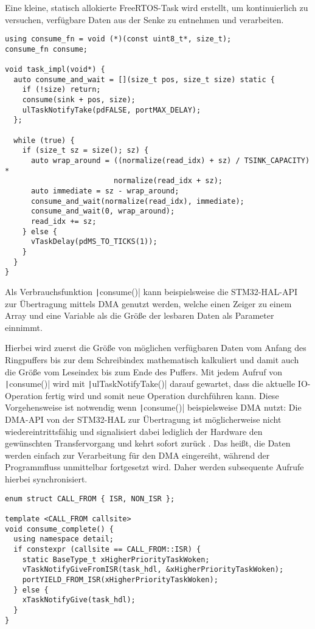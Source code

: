 Eine kleine, statisch allokierte FreeRTOS-Task wird erstellt, um kontinuierlich
zu versuchen, verfügbare Daten aus der Senke zu entnehmen und verarbeiten.

\begin{code}
\begin{verbatim}
using consume_fn = void (*)(const uint8_t*, size_t);
consume_fn consume;

void task_impl(void*) {
  auto consume_and_wait = [](size_t pos, size_t size) static {
    if (!size) return;
    consume(sink + pos, size);
    ulTaskNotifyTake(pdFALSE, portMAX_DELAY);
  };

  while (true) {
    if (size_t sz = size(); sz) {
      auto wrap_around = ((normalize(read_idx) + sz) / TSINK_CAPACITY) *
                         normalize(read_idx + sz);
      auto immediate = sz - wrap_around;
      consume_and_wait(normalize(read_idx), immediate);
      consume_and_wait(0, wrap_around);
      read_idx += sz;
    } else {
      vTaskDelay(pdMS_TO_TICKS(1));
    }
  }
}
\end{verbatim}
\end{code}

Als Verbrauchsfunktion \texttt|consume()| kann beispielsweise die
STM32-HAL-API zur Übertragung mittels DMA genutzt werden, welche einen Zeiger
zu einem Array und eine Variable als die Größe der lesbaren Daten als Parameter
einnimmt.

Hierbei wird zuerst die Größe von möglichen verfügbaren Daten vom Anfang des
Ringpuffers bis zur dem Schreibindex mathematisch kalkuliert und damit auch die
Größe vom Leseindex bis zum Ende des Puffers. Mit jedem Aufruf von
\texttt|consume()| wird mit \texttt|ulTaskNotifyTake()| darauf
gewartet, dass die aktuelle IO-Operation fertig wird und somit neue Operation
durchführen kann. Diese Vorgehensweise ist notwendig wenn
\texttt|consume()| beispielsweise DMA nutzt: Die DMA-API von der
STM32-HAL zur Übertragung ist möglicherweise nicht wiedereintrittsfähig und
signalisiert dabei lediglich der Hardware den gewünschten Transfervorgang und
kehrt sofort zurück \cite{HAL_UART_Transmit_DMA}. Das heißt, die Daten werden
einfach zur Verarbeitung für den DMA eingereiht, während der Programmfluss
unmittelbar fortgesetzt wird. Daher werden subsequente Aufrufe hierbei
synchronisiert.

\begin{code}
\begin{verbatim}
enum struct CALL_FROM { ISR, NON_ISR };

template <CALL_FROM callsite>
void consume_complete() {
  using namespace detail;
  if constexpr (callsite == CALL_FROM::ISR) {
    static BaseType_t xHigherPriorityTaskWoken;
    vTaskNotifyGiveFromISR(task_hdl, &xHigherPriorityTaskWoken);
    portYIELD_FROM_ISR(xHigherPriorityTaskWoken);
  } else {
    xTaskNotifyGive(task_hdl);
  }
}
\end{verbatim}
\end{code}

